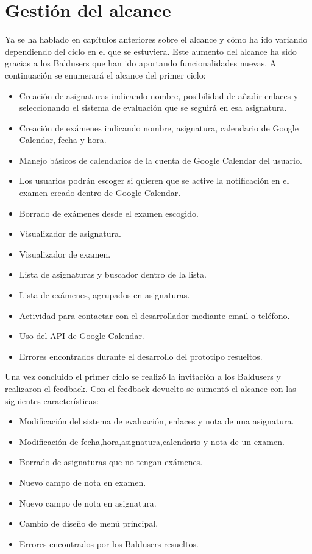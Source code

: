 \section{Gestión del alcance}
\label{secc:Gestión del alcance}

Ya se ha hablado en capítulos anteriores sobre el alcance y cómo ha ido variando dependiendo del ciclo en el que se estuviera. Este aumento del alcance ha sido gracias a los Baldusers que han ido aportando funcionalidades nuevas.
A continuación se enumerará el alcance del primer ciclo:
\begin{itemize}
	\item Creación de asignaturas indicando nombre, posibilidad de añadir enlaces y seleccionando el sistema de evaluación que se seguirá en esa asignatura. 
	\item Creación de exámenes indicando nombre, asignatura, calendario de Google Calendar, fecha y hora.
	\item Manejo básicos de calendarios de la cuenta de Google Calendar del usuario. 
	\item Los usuarios podrán escoger si quieren que se active la notificación en el examen creado dentro de Google Calendar.
	\item Borrado de exámenes desde el examen escogido.
	\item Visualizador de asignatura.
	\item Visualizador de examen.
	\item Lista de asignaturas y buscador dentro de la lista.
	\item Lista de exámenes, agrupados en asignaturas.
	\item Actividad para contactar con el desarrollador mediante email o teléfono.
	\item Uso del API de Google Calendar.
	\item Errores encontrados durante el desarrollo del prototipo resueltos.
\end{itemize}
\newpage
Una vez concluido el primer ciclo se realizó la invitación a los Baldusers y realizaron el feedback. Con el feedback devuelto se aumentó el alcance con las siguientes características:
\begin{itemize}
	\item Modificación del sistema de evaluación, enlaces y nota de una asignatura.
	\item Modificación de fecha,hora,asignatura,calendario y nota de un examen.
	\item Borrado de asignaturas que no tengan exámenes.
	\item Nuevo campo de nota en examen.
	\item Nuevo campo de nota en asignatura.
	\item Cambio de diseño de menú principal.
	\item Errores encontrados por los Baldusers resueltos.
\end{itemize}

